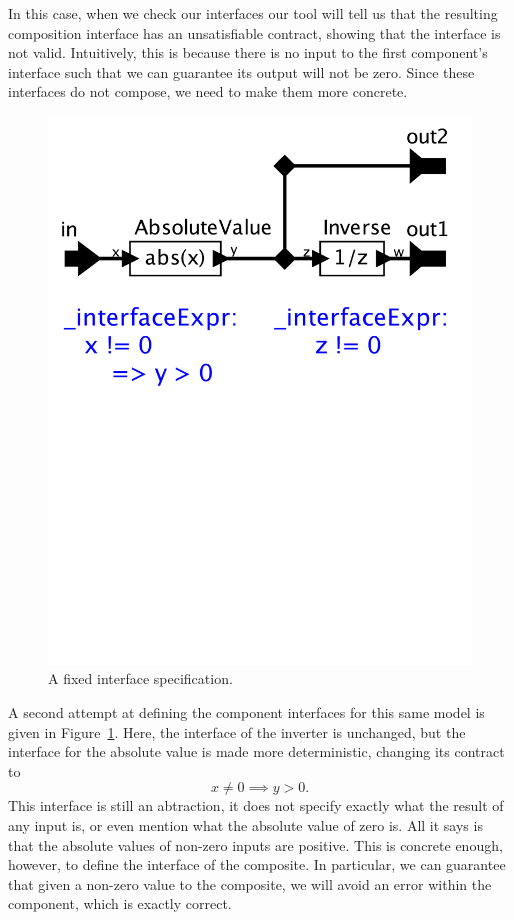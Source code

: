 \documentclass[preprint,11pt]{sigplanconf}
\begin{document}
In this case, when we check our interfaces our tool will tell us that the
resulting composition interface has an unsatisfiable contract, showing that the
interface is not valid. Intuitively, this is because there is no input to the
first component's interface such that we can guarantee its output will not be
zero. Since these interfaces do not compose, we need to make them more concrete.

\begin{figure}[htbp]
\centering
\includegraphics[width=\columnwidth]{figs/absoluteCorrected}
\caption{A fixed interface specification.}
\label{fig:absoluteCorrected}
\end{figure}

A second attempt at defining the component interfaces for this same model is
given in Figure~\ref{fig:absoluteCorrected}.
Here, the interface of the inverter is unchanged,
but the interface for the absolute value is made more deterministic, changing
its contract to
\[
x \ne 0 \implies y > 0 .
\]
This interface is still an abtraction, it does not specify exactly what
the result of any input is, or even mention what the absolute value of zero is.
All it says is that the absolute values of non-zero inputs are positive.
This is concrete enough, however, to define the interface of the composite.  In
particular, we can guarantee that given a non-zero value to the composite, we
will avoid an error within the component, which is exactly correct.
\end{document}
